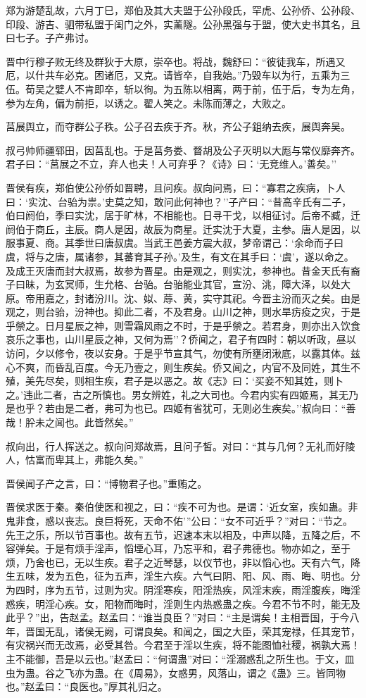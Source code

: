 \documentclass[]{article}
\begin{document}
郑为游楚乱故，六月丁巳，郑伯及其大夫盟于公孙段氏，罕虎、公孙侨、公孙段、印段、游吉、驷带私盟于闺门之外，实薰隧。公孙黑强与于盟，使大史书其名，且曰七子。子产弗讨。

晋中行穆子败无终及群狄于大原，崇卒也。将战，魏舒曰：``彼徒我车，所遇又厄，以什共车必克。困诸厄，又克。请皆卒，自我始。''乃毁车以为行，五乘为三伍。荀吴之嬖人不肯即卒，斩以徇。为五陈以相离，两于前，伍于后，专为左角，参为左角，偏为前拒，以诱之。翟人笑之。未陈而薄之，大败之。

莒展舆立，而夺群公子秩。公子召去疾于齐。秋，齐公子鉏纳去疾，展舆奔吴。

叔弓帅师疆郓田，因莒乱也。于是莒务娄、瞀胡及公子灭明以大厖与常仪靡奔齐。君子曰：``莒展之不立，弃人也夫！人可弃乎？《诗》曰：`无竞维人。'善矣。''

晋侯有疾，郑伯使公孙侨如晋聘，且问疾。叔向问焉，曰：``寡君之疾病，卜人曰：`实沈、台骀为祟。'史莫之知，敢问此何神也？''子产曰：``昔高辛氏有二子，伯曰阏伯，季曰实沈，居于旷林，不相能也。日寻干戈，以相征讨。后帝不臧，迁阏伯于商丘，主辰。商人是因，故辰为商星。迁实沈于大夏，主参。唐人是因，以服事夏、商。其季世曰唐叔虞。当武王邑姜方震大叔，梦帝谓己：`余命而子曰虞，将与之唐，属诸参，其蕃育其子孙。'及生，有文在其手曰：`虞'，遂以命之。及成王灭唐而封大叔焉，故参为晋星。由是观之，则实沈，参神也。昔金天氏有裔子曰昧，为玄冥师，生允格、台骀。台骀能业其官，宣汾、洮，障大泽，以处大原。帝用嘉之，封诸汾川。沈、姒、蓐、黄，实守其祀。今晋主汾而灭之矣。由是观之，则台骀，汾神也。抑此二者，不及君身。山川之神，则水旱疠疫之灾，于是乎禜之。日月星辰之神，则雪霜风雨之不时，于是乎禜之。若君身，则亦出入饮食哀乐之事也，山川星辰之神，又何为焉''？侨闻之，君子有四时：朝以听政，昼以访问，夕以修令，夜以安身。于是乎节宣其气，勿使有所壅闭湫底，以露其体。兹心不爽，而昏乱百度。今无乃壹之，则生疾矣。侨又闻之，内官不及同姓，其生不殖，美先尽矣，则相生疾，君子是以恶之。故《志》曰：`买妾不知其姓，则卜之。'违此二者，古之所慎也。男女辨姓，礼之大司也。今君内实有四姬焉，其无乃是也乎？若由是二者，弗可为也已。四姬有省犹可，无则必生疾矣。''叔向曰：``善哉！肸未之闻也。此皆然矣。''

叔向出，行人挥送之。叔向问郑故焉，且问子皙。对曰：``其与几何？无礼而好陵人，怙富而卑其上，弗能久矣。''

晋侯闻子产之言，曰：``博物君子也。''重贿之。

晋侯求医于秦。秦伯使医和视之，曰：``疾不可为也。是谓：`近女室，疾如蛊。非鬼非食，惑以丧志。良巨将死，天命不佑'''公曰：``女不可近乎？''对曰：``节之。先王之乐，所以节百事也。故有五节，迟速本末以相及，中声以降，五降之后，不容弹矣。于是有烦手淫声，慆堙心耳，乃忘平和，君子弗德也。物亦如之，至于烦，乃舍也已，无以生疾。君子之近琴瑟，以仪节也，非以慆心也。天有六气，降生五味，发为五色，征为五声，淫生六疾。六气曰阴、阳、风、雨、晦、明也。分为四时，序为五节，过则为灾。阴淫寒疾，阳淫热疾，风淫末疾，雨淫腹疾，晦淫惑疾，明淫心疾。女，阳物而晦时，淫则生内热惑蛊之疾。今君不节不时，能无及此乎？''出，告赵孟。赵孟曰：``谁当良臣？''对曰：``主是谓矣！主相晋国，于今八年，晋国无乱，诸侯无阙，可谓良矣。和闻之，国之大臣，荣其宠禄，任其宠节，有灾祸兴而无改焉，必受其咎。今君至于淫以生疾，将不能图恤社稷，祸孰大焉！主不能御，吾是以云也。''赵孟曰：``何谓蛊''对曰：``淫溺惑乱之所生也。于文，皿虫为蛊。谷之飞亦为蛊。在《周易》，女惑男，风落山，谓之《蛊》三。皆同物也。''赵孟曰：``良医也。''厚其礼归之。
\end{document}
